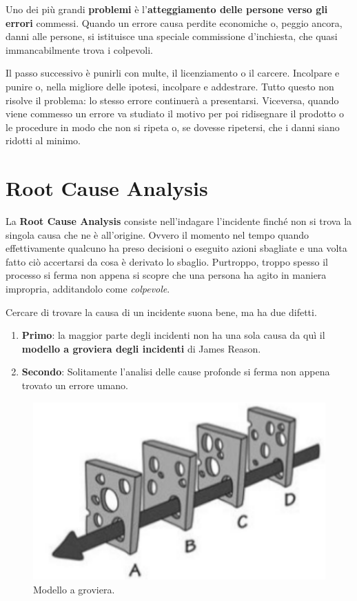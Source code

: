 \documentclass[a4paper,11pt,oneside]{book}
\begin{document}
Uno dei più grandi \textbf{problemi} è l'\textbf{atteggiamento delle persone verso gli errori} commessi. Quando un errore causa perdite economiche o, peggio ancora, danni alle persone, si istituisce una speciale commissione d'inchiesta, che quasi immancabilmente trova i colpevoli.

Il passo successivo è punirli con multe, il licenziamento o il carcere. Incolpare
e punire o, nella migliore delle ipotesi, incolpare e addestrare. Tutto questo non
risolve il problema: lo stesso errore continuerà a presentarsi. Viceversa, quando viene commesso un errore va studiato il motivo per poi ridisegnare il prodotto o le procedure in modo che non si ripeta o, se dovesse ripetersi, che i danni siano ridotti al minimo.

\section{Root Cause Analysis}
La \textbf{Root Cause Analysis} consiste nell'indagare l'incidente finché non si trova la singola causa che ne è all'origine. Ovvero il momento nel tempo quando effettivamente qualcuno ha preso decisioni o eseguito azioni sbagliate e
una volta fatto ciò accertarsi da cosa è derivato lo sbaglio. Purtroppo, troppo spesso il processo si ferma non appena si scopre che una persona ha agito in maniera impropria, additandolo come \textit{colpevole}.

Cercare di trovare la causa di un incidente suona bene, ma ha due difetti.

\begin{enumerate}
	\item \textbf{Primo}: la maggior parte degli incidenti non ha una sola causa da quì il \textbf{modello a groviera degli incidenti} di James Reason.
	\item \textbf{Secondo}: Solitamente l'analisi delle cause profonde si ferma non appena trovato un errore umano.
\end{enumerate}

\pagebreak

\begin{figure}[!h]
	\centering
	\includegraphics[scale=0.55]{immagini/Groviera.png}
	\caption{Modello a groviera.}
\end{figure}
\end{document}
